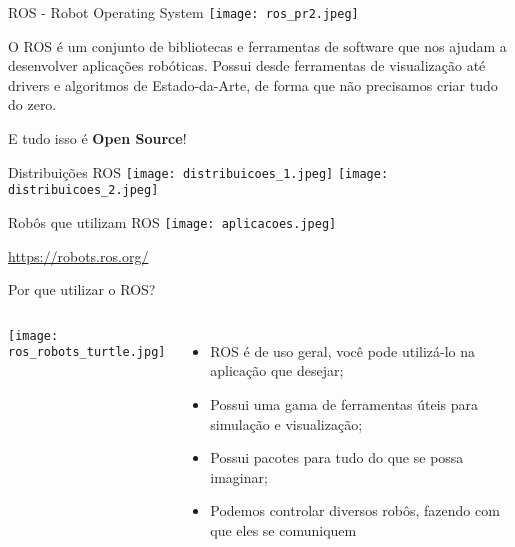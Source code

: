 \begin{frame}[t]{ROS - Robot Operating System} 
  \centering
  \texttt{[image: ros\_pr2.jpeg]}
  
  \vspace{.5cm}
  O ROS é um conjunto de bibliotecas e ferramentas de software que nos ajudam a desenvolver aplicações robóticas. Possui desde ferramentas de visualização até drivers e algoritmos de Estado-da-Arte, de forma que não precisamos criar tudo do zero.

  E tudo isso é \textbf{Open Source}!
\end{frame}


\begin{frame}[t]{Distribuições ROS} 
  \centering
  \texttt{[image: distribuicoes\_1.jpeg]}
  \texttt{[image: distribuicoes\_2.jpeg]}
\end{frame}


\begin{frame}[t]{Robôs que utilizam ROS} 
  \centering
  \texttt{[image: aplicacoes.jpeg]}
  
  \href{https://robots.ros.org/}{https://robots.ros.org/}


\end{frame}


\begin{frame}[t]{Por que utilizar o ROS?} 
  \begin{columns}
    \texttt{[image: ros\_robots\_turtle.jpg]}
    
    \begin{itemize}
      \item ROS é de uso geral, você pode utilizá-lo na aplicação que desejar;
      \item Possui uma gama de ferramentas úteis para simulação e visualização;
      \item Possui pacotes para tudo do que se possa imaginar;
      \item Podemos controlar diversos robôs, fazendo com que eles se comuniquem
    \end{itemize}

  \end{columns}
\end{frame}


